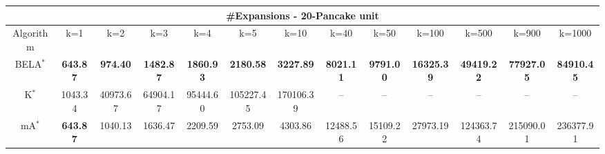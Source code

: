 \begin{tabular}{c|cccccccccccc}\toprule
\multicolumn{13}{c}{#Expansions - 20-Pancake unit}\\ \midrule
Algorithm & k=1 & k=2 & k=3 & k=4 & k=5 & k=10 & k=40 & k=50 & k=100 & k=500 & k=900 & k=1000 \\ \midrule
BELA$^*$ & \textbf{643.87} & \textbf{974.40} & \textbf{1482.87} & \textbf{1860.93} & \textbf{2180.58} & \textbf{3227.89} & \textbf{8021.11} & \textbf{9791.00} & \textbf{16325.39} & \textbf{49419.22} & \textbf{77927.05} & \textbf{84910.45} \\
K$^*$ & 1043.34 & 40973.67 & 64904.17 & 95444.60 & 105227.45 & 170106.39 & -- & -- & -- & -- & -- & -- \\
mA$^*$ & \textbf{643.87} & 1040.13 & 1636.47 & 2209.59 & 2753.09 & 4303.86 & 12488.56 & 15109.22 & 27973.19 & 124363.74 & 215090.01 & 236377.91 \\ \bottomrule 
\end{tabular}
